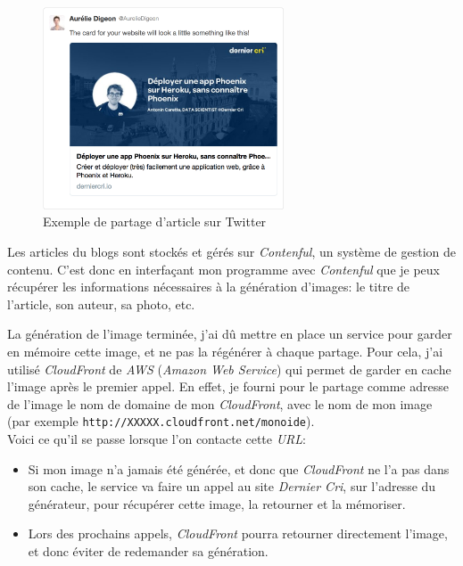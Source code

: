 \documentclass[12pt,a4paper]{article}
\begin{document}
  \begin{figure}[h]
    \centering
    \includegraphics[height=6cm]{figures/partage-blog.png}
    \caption{Exemple de partage d'article sur Twitter}
  \end{figure}

  \bigskip

  Les articles du blogs sont stockés et gérés sur \emph{Contenful}, un
  système de gestion de contenu. C'est donc en interfaçant mon programme
  avec \emph{Contenful} que je peux récupérer les informations nécessaires
  à la génération d'images: le titre de l'article, son auteur, sa photo,
  etc.

  \bigskip

  La génération de l'image terminée, j'ai dû mettre en place un service
  pour garder en mémoire cette image, et ne pas la régénérer à chaque
  partage. Pour cela, j'ai utilisé \emph{CloudFront} de \emph{AWS}
  (\emph{Amazon Web Service}) qui permet de garder en cache l'image après
  le premier appel. En effet, je fourni pour le partage comme adresse de
  l'image le nom de domaine de mon \emph{CloudFront}, avec le nom de mon
  image (par exemple \texttt{http://XXXXX.cloudfront.net/monoide}).\\
  Voici ce qu'il se passe lorsque l'on contacte cette \emph{URL}:

  \begin{itemize}
  \item
    Si mon image n'a jamais été générée, et donc que \emph{CloudFront} ne
    l'a pas dans son cache, le service va faire un appel au site
    \emph{Dernier Cri}, sur l'adresse du générateur, pour récupérer cette
    image, la retourner et la mémoriser.
  \item
    Lors des prochains appels, \emph{CloudFront} pourra retourner
    directement l'image, et donc éviter de redemander sa génération.
  \end{itemize}
\end{document}
